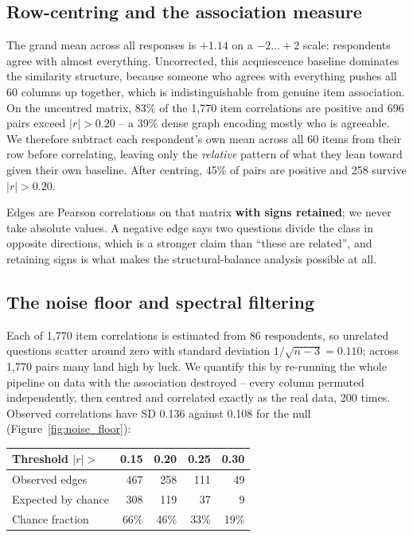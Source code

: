 \subsection{Row-centring and the association measure}

The grand mean across all responses is $+1.14$ on a $-2 \ldots +2$ scale: respondents
agree with almost everything. Uncorrected, this acquiescence baseline dominates the
similarity structure, because someone who agrees with everything pushes all 60 columns up
together, which is indistinguishable from genuine item association. On the uncentred
matrix, 83\% of the 1{,}770 item correlations are positive and 696 pairs exceed
$|r|>0.20$ -- a 39\% dense graph encoding mostly who is agreeable. We therefore subtract
each respondent's own mean across all 60 items from their row before correlating, leaving
only the \emph{relative} pattern of what they lean toward given their own baseline. After
centring, 45\% of pairs are positive and 258 survive $|r|>0.20$.

Edges are Pearson correlations on that matrix \textbf{with signs retained}; we never take
absolute values. A negative edge says two questions divide the class in opposite
directions, which is a stronger claim than ``these are related'', and retaining signs is
what makes the structural-balance analysis possible at all.

\subsection{The noise floor and spectral filtering}
\label{subsec:mp}

Each of 1{,}770 item correlations is estimated from 86 respondents, so unrelated questions
scatter around zero with standard deviation $1/\sqrt{n-3} = 0.110$; across 1{,}770 pairs
many land high by luck. We quantify this by re-running the whole pipeline on data with the
association destroyed -- every column permuted independently, then centred and correlated
exactly as the real data, 200 times. Observed correlations have SD 0.136 against 0.108 for
the null (Figure~\ref{fig:noise_floor}):

\begin{center}
\begin{tabular}{lrrrr}
\toprule
Threshold $|r| >$ & 0.15 & 0.20 & 0.25 & 0.30 \\
\midrule
Observed edges & 467 & 258 & 111 & 49 \\
Expected by chance & 308 & 119 & 37 & 9 \\
Chance fraction & 66\% & 46\% & 33\% & 19\% \\
\bottomrule
\end{tabular}
\end{center}

